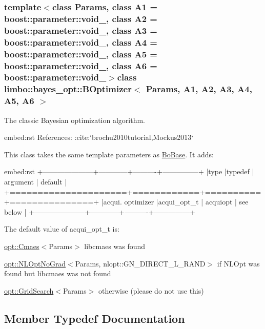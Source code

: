 \subsubsection*{template$<$class Params, class A1 = boost\+::parameter\+::void\+\_\+, class A2 = boost\+::parameter\+::void\+\_\+, class A3 = boost\+::parameter\+::void\+\_\+, class A4 = boost\+::parameter\+::void\+\_\+, class A5 = boost\+::parameter\+::void\+\_\+, class A6 = boost\+::parameter\+::void\+\_\+$>$class limbo\+::bayes\+\_\+opt\+::\+B\+Optimizer$<$ Params, A1, A2, A3, A4, A5, A6 $>$}

The classic Bayesian optimization algorithm.

\begin{DoxyVerb}embed:rst
References: :cite:`brochu2010tutorial,Mockus2013`
\end{DoxyVerb}


This class takes the same template parameters as \hyperlink{classlimbo_1_1bayes__opt_1_1_bo_base}{Bo\+Base}. It adds\+: \begin{DoxyVerb}embed:rst
+---------------------+------------+----------+---------------+
|type                 |typedef     | argument | default       |
+=====================+============+==========+===============+
|acqui. optimizer     |acqui_opt_t | acquiopt | see below     |
+---------------------+------------+----------+---------------+
\end{DoxyVerb}


The default value of acqui\+\_\+opt\+\_\+t is\+:
\begin{DoxyItemize}
\item {\ttfamily \hyperlink{structlimbo_1_1opt_1_1_cmaes}{opt\+::\+Cmaes}$<$Params$>$} libcmaes was found
\item {\ttfamily \hyperlink{structlimbo_1_1opt_1_1_n_l_opt_no_grad}{opt\+::\+N\+L\+Opt\+No\+Grad}$<$Params, nlopt\+::\+G\+N\+\_\+\+D\+I\+R\+E\+C\+T\+\_\+\+L\+\_\+\+R\+A\+N\+D$>$} if N\+L\+Opt was found but libcmaes was not found
\item {\ttfamily \hyperlink{structlimbo_1_1opt_1_1_grid_search}{opt\+::\+Grid\+Search}$<$Params$>$} otherwise (please do not use this) 
\end{DoxyItemize}

\subsection{Member Typedef Documentation}
\hypertarget{classlimbo_1_1bayes__opt_1_1_b_optimizer_a18dc1b593c859b8f89450a31f80fb592}{}
